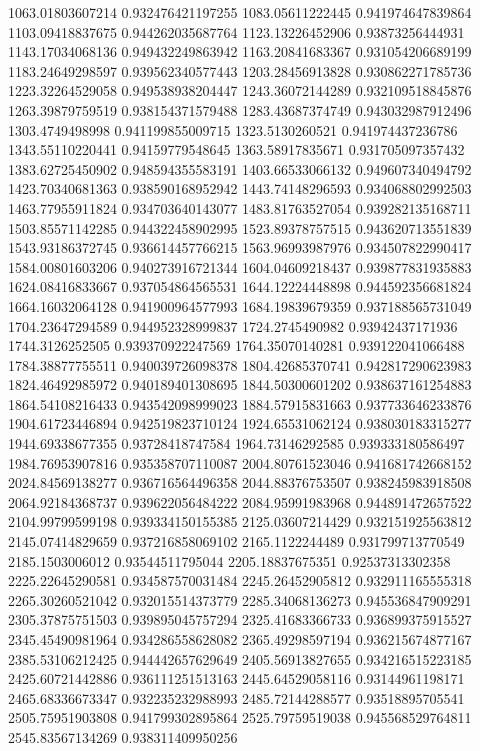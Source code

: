 {1063.01803607214 0.932476421197255
1083.05611222445 0.941974647839864
1103.09418837675 0.944262035687764
1123.13226452906 0.93873256444931
1143.17034068136 0.949432249863942
1163.20841683367 0.931054206689199
1183.24649298597 0.939562340577443
1203.28456913828 0.930862271785736
1223.32264529058 0.949538938204447
1243.36072144289 0.932109518845876
1263.39879759519 0.938154371579488
1283.43687374749 0.943032987912496
1303.4749498998 0.941199855009715
1323.5130260521 0.941974437236786
1343.55110220441 0.94159779548645
1363.58917835671 0.931705097357432
1383.62725450902 0.948594355583191
1403.66533066132 0.949607340494792
1423.70340681363 0.938590168952942
1443.74148296593 0.934068802992503
1463.77955911824 0.934703640143077
1483.81763527054 0.939282135168711
1503.85571142285 0.944322458902995
1523.89378757515 0.943620713551839
1543.93186372745 0.936614457766215
1563.96993987976 0.934507822990417
1584.00801603206 0.940273916721344
1604.04609218437 0.939877831935883
1624.08416833667 0.937054864565531
1644.12224448898 0.944592356681824
1664.16032064128 0.941900964577993
1684.19839679359 0.937188565731049
1704.23647294589 0.944952328999837
1724.2745490982 0.93942437171936
1744.3126252505 0.939370922247569
1764.35070140281 0.939122041066488
1784.38877755511 0.940039726098378
1804.42685370741 0.942817290623983
1824.46492985972 0.940189401308695
1844.50300601202 0.938637161254883
1864.54108216433 0.943542098999023
1884.57915831663 0.937733646233876
1904.61723446894 0.942519823710124
1924.65531062124 0.938030183315277
1944.69338677355 0.93728418747584
1964.73146292585 0.939333180586497
1984.76953907816 0.935358707110087
2004.80761523046 0.941681742668152
2024.84569138277 0.936716564496358
2044.88376753507 0.938245983918508
2064.92184368737 0.939622056484222
2084.95991983968 0.944891472657522
2104.99799599198 0.939334150155385
2125.03607214429 0.932151925563812
2145.07414829659 0.937216858069102
2165.1122244489 0.931799713770549
2185.1503006012 0.93544511795044
2205.18837675351 0.92537313302358
2225.22645290581 0.934587570031484
2245.26452905812 0.932911165555318
2265.30260521042 0.932015514373779
2285.34068136273 0.945536847909291
2305.37875751503 0.939895045757294
2325.41683366733 0.936899375915527
2345.45490981964 0.934286558628082
2365.49298597194 0.936215674877167
2385.53106212425 0.944442657629649
2405.56913827655 0.934216515223185
2425.60721442886 0.936111251513163
2445.64529058116 0.93144961198171
2465.68336673347 0.932235232988993
2485.72144288577 0.93518895705541
2505.75951903808 0.941799302895864
2525.79759519038 0.945568529764811
2545.83567134269 0.938311409950256
}
